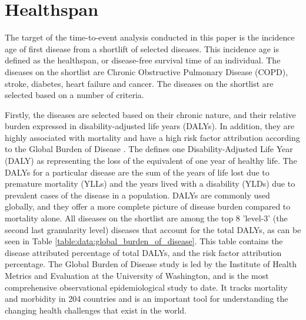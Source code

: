 \section{Healthspan}
\label{section:data:healthspan_target}
The target of the time-to-event analysis conducted in this paper is the incidence age of first disease from a shortlift of selected diseases. This incidence age is defined as the healthspan, or disease-free survival time of an individual. The diseases on the shortlist are Chronic Obstructive Pulmonary Disease (COPD), stroke, diabetes, heart failure and cancer. The diseases on the shortlist are selected based on a number of criteria. 

Firstly, the diseases are selected based on their chronic nature, and their relative burden expressed in disability-adjusted life years (DALYs). In addition, they are highly associated with mortality and have a high risk factor attribution according to the Global Burden of Disease \citep{GBD}. The \cite{WorldHealthOrganization} defines one Disability-Adjusted Life Year (DALY) as representing the loss of the equivalent of one year of healthy life. The DALYs for a particular disease are the sum of the years of life lost due to premature mortality (YLLs) and the years lived with a disability (YLDs) due to prevalent cases of the disease in a population. DALYs are commonly used globally, and they offer a more complete picture of disease burden compared to mortality alone. All  diseases on the shortlist are among the top 8 'level-3' (the second last granularity level) diseases that account for the total DALYs, as can be seen in Table \ref{table:data:global_burden_of_disease}. This table contains the disease attributed percentage of total DALYs, and the risk factor attribution percentage. The Global Burden of Disease study is led by the Institute of Health Metrics and Evaluation at the University of Washington, and is the most comprehensive observational epidemiological study to date. It tracks mortality and morbidity in 204 countries and is an important tool for understanding the changing health challenges that exist in the world.
\vspace{0.5cm}

